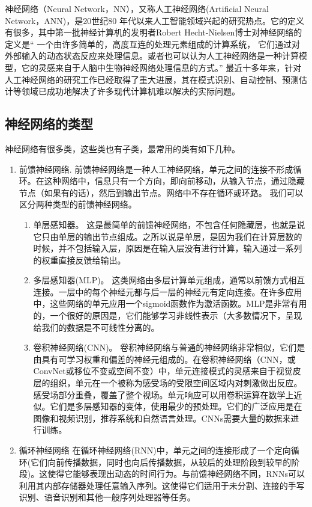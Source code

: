 神经网络（Neural Network，NN），又称人工神经网络(Artificial Neural Network，ANN)，是20世纪80 年代以来人工智能领域兴起的研究热点。它的定义有很多，其中第一批神经计算机的发明者Robert Hecht-Nielsen博士对神经网络的定义是“ 一个由许多简单的，高度互连的处理元素组成的计算系统， 它们通过对外部输入的动态状态反应来处理信息。或者也可以认为人工神经网络是一种计算模型，它的灵感来自于人脑中生物神经网络处理信息的方式。”
最近十多年来，针对人工神经网络的研究工作已经取得了重大进展，其在模式识别、自动控制、预测估计等领域已成功地解决了许多现代计算机难以解决的实际问题。

\subsection{神经网络的类型}
神经网络有很多类，这些类也有子类，最常用的类有如下几种。
\begin{enumerate}
    \item 前馈神经网络.
前馈神经网络是一种人工神经网络，单元之间的连接不形成循环。在这种网络中，信息只有一个方向，即向前移动，从输入节点，通过隐藏节点（如果有的话），然后到输出节点。网络中不存在循环或环路。
我们可以区分两种类型的前馈神经网络。
\begin{enumerate}
    \item 单层感知器。
    这是最简单的前馈神经网络，不包含任何隐藏层，也就是说它只由单层的输出节点组成。之所以说是单层，是因为我们在计算层数的时候，并不包括输入层，原因是在输入层没有进行计算，输入通过一系列的权重直接反馈给输出。
    \item 多层感知器(MLP)。
这类网络由多层计算单元组成，通常以前馈方式相互连接。一层中的每个神经元都与后一层的神经元有定向连接。在许多应用中，这些网络的单元应用一个sigmoid函数作为激活函数。MLP是非常有用的，一个很好的原因是，它们能够学习非线性表示（大多数情况下，呈现给我们的数据是不可线性分离的。
\item  卷积神经网络(CNN)。
卷积神经网络与普通的神经网络非常相似，它们是由具有可学习权重和偏差的神经元组成的。在卷积神经网络（CNN，或ConvNet或移位不变或空间不变）中，单元连接模式的灵感来自于视觉皮层的组织，单元在一个被称为感受场的受限空间区域内对刺激做出反应。感受场部分重叠，覆盖了整个视场。单元响应可以用卷积运算在数学上近似。它们是多层感知器的变体，使用最少的预处理。它们的广泛应用是在图像和视频识别，推荐系统和自然语言处理。CNNs需要大量的数据来进行训练。
\end{enumerate}
\item  循环神经网络
在循环神经网络(RNN)中，单元之间的连接形成了一个定向循环(它们向前传播数据，同时也向后传播数据，从较后的处理阶段到较早的阶段)。这使得它能够表现出动态的时间行为。与前馈神经网络不同，RNNs可以利用其内部存储器处理任意输入序列。这使得它们适用于未分割、连接的手写识别、语音识别和其他一般序列处理器等任务。
\end{enumerate}


